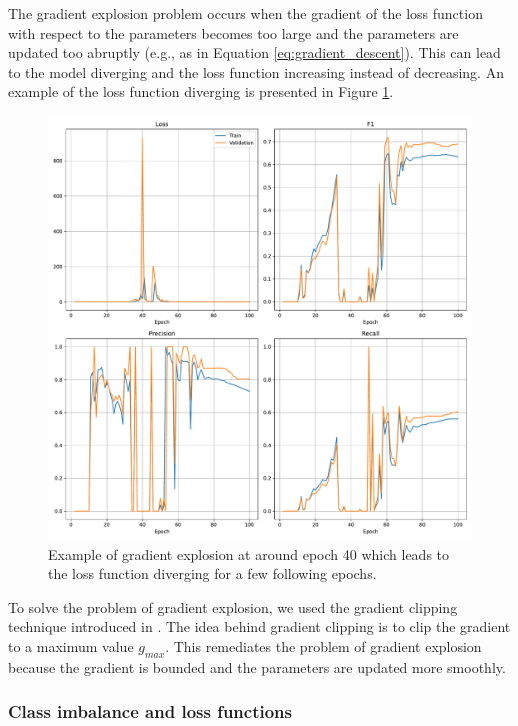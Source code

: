 \documentclass[a4paper, twoside]{report}
\theoremstyle{definition}
\numberwithin{equation}{section}
\begin{document}
The gradient explosion problem occurs when the gradient of the loss function with respect to the parameters
becomes too large and the parameters are updated too abruptly (e.g., as in Equation \ref{eq:gradient_descent}).
This can lead to the model diverging and the loss function increasing instead of decreasing.
An example of the loss function diverging is presented in Figure \ref{fig:gradient_explosion}.

\begin{figure}[h!]
    \centering
    \includegraphics[width=\textwidth]{etc/gradient_explosion.pdf}
    \caption{Example of gradient explosion at around epoch 40 which leads to the loss function diverging for a few following epochs.}
    \label{fig:gradient_explosion}
\end{figure}

To solve the problem of gradient explosion, we used the gradient clipping technique introduced
in \cite{1211.5063}.
The idea behind gradient clipping is to clip the gradient to a maximum value $g_{max}$.
This remediates the problem of gradient explosion because the gradient is bounded and the parameters
are updated more smoothly.

\subsubsection{Class imbalance and loss functions} \label{sec:class_imbalance}
\end{document}
